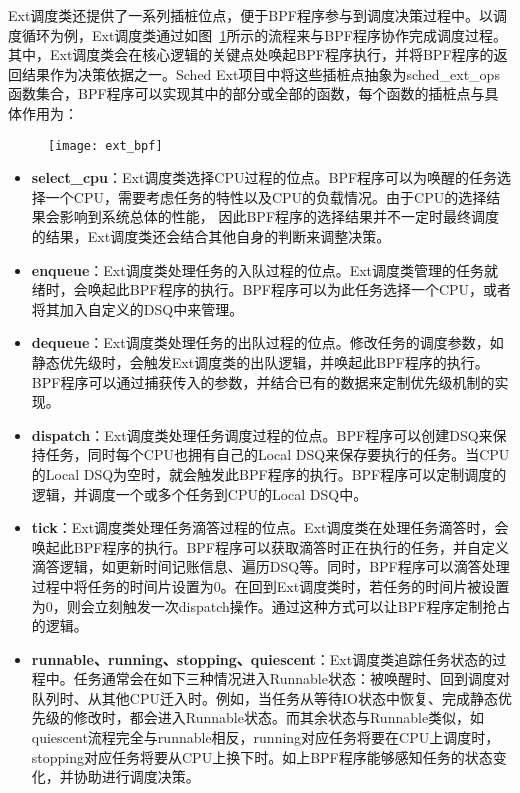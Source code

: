 Ext调度类还提供了一系列插桩位点，便于BPF程序参与到调度决策过程中。以调度循环为例，Ext调度类通过如图~\ref{fig:ext_bpf}所示的流程来与BPF程序协作完成调度过程。其中，Ext调度类会在核心逻辑的关键点处唤起BPF程序执行，并将BPF程序的返回结果作为决策依据之一。Sched Ext项目中将这些插桩点抽象为sched\_ext\_ops函数集合，BPF程序可以实现其中的部分或全部的函数，每个函数的插桩点与具体作用为：

\begin{figure}[!htbp]
    \centering
    \texttt{[image: ext\_bpf]}
    \label{fig:ext_bpf}
\end{figure}

\begin{itemize}

    \item \textbf{select\_cpu}：Ext调度类选择CPU过程的位点。BPF程序可以为唤醒的任务选择一个CPU，需要考虑任务的特性以及CPU的负载情况。由于CPU的选择结果会影响到系统总体的性能，
    因此BPF程序的选择结果并不一定时最终调度的结果，Ext调度类还会结合其他自身的判断来调整决策。

    \item \textbf{enqueue}：Ext调度类处理任务的入队过程的位点。Ext调度类管理的任务就绪时，会唤起此BPF程序的执行。BPF程序可以为此任务选择一个CPU，或者将其加入自定义的DSQ中来管理。

    \item \textbf{dequeue}：Ext调度类处理任务的出队过程的位点。修改任务的调度参数，如静态优先级时，会触发Ext调度类的出队逻辑，并唤起此BPF程序的执行。BPF程序可以通过捕获传入的参数，并结合已有的数据来定制优先级机制的实现。
    
    \item \textbf{dispatch}：Ext调度类处理任务调度过程的位点。BPF程序可以创建DSQ来保持任务，同时每个CPU也拥有自己的Local DSQ来保存要执行的任务。当CPU的Local DSQ为空时，就会触发此BPF程序的执行。BPF程序可以定制调度的逻辑，并调度一个或多个任务到CPU的Local DSQ中。
    
    \item \textbf{tick}：Ext调度类处理任务滴答过程的位点。Ext调度类在处理任务滴答时，会唤起此BPF程序的执行。BPF程序可以获取滴答时正在执行的任务，并自定义滴答逻辑，如更新时间记账信息、遍历DSQ等。同时，BPF程序可以滴答处理过程中将任务的时间片设置为0。在回到Ext调度类时，若任务的时间片被设置为0，则会立刻触发一次dispatch操作。通过这种方式可以让BPF程序定制抢占的逻辑。

    \item \textbf{runnable、running、stopping、quiescent}：Ext调度类追踪任务状态的过程中。任务通常会在如下三种情况进入Runnable状态：被唤醒时、回到调度对队列时、从其他CPU迁入时。例如，当任务从等待IO状态中恢复、完成静态优先级的修改时，都会进入Runnable状态。而其余状态与Runnable类似，如quiescent流程完全与runnable相反，running对应任务将要在CPU上调度时，stopping对应任务将要从CPU上换下时。如上BPF程序能够感知任务的状态变化，并协助进行调度决策。


\end{itemize}
